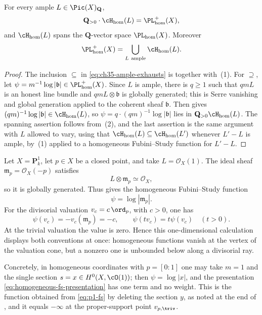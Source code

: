 \begin{corollary}
\label{cor:ch35-ample-exhausts}
For every ample $L\in\Pic(X)_{\mathbf Q}$,
\begin{equation}
\label{eq:ch35-ample-exhausts}
 \mathbf Q_{>0}\cdot\cH_{\mathrm{hom}}(L)=\PL^+_{\mathrm{hom}}(X),
\end{equation}
and $\cH_{\mathrm{hom}}(L)$ spans the $\mathbf Q$-vector space
$\PL_{\mathrm{hom}}(X)$.  Moreover
\[
 \PL^+_{\mathrm{hom}}(X)
   =\bigcup_{L\ \mathrm{ample}}\cH_{\mathrm{hom}}(L).
\]
\end{corollary}

\begin{proof}
The inclusion $\subseteq$ in \eqref{eq:ch35-ample-exhausts} is
 together with
\,(1).  For $\supseteq$, let
$\psi=m^{-1}\log|\mathfrak b|\in\PL^+_{\mathrm{hom}}(X)$.  Since $L$ is
ample, there is $q\geq1$ such that $qmL$ is an honest line bundle and
$qmL\otimes\mathfrak b$ is globally generated; this is Serre vanishing and
global generation applied to the coherent sheaf $\mathfrak b$.  Then
 gives
$(qm)^{-1}\log|\mathfrak b|\in\cH_{\mathrm{hom}}(L)$, so
$\psi=q\cdot(qm)^{-1}\log|\mathfrak b|$ lies in
$\mathbf Q_{>0}\cH_{\mathrm{hom}}(L)$.  The spanning assertion follows
from \,(2), and the last assertion is the
same argument with $L$ allowed to vary, using that
$\cH_{\mathrm{hom}}(L)\subseteq\cH_{\mathrm{hom}}(L')$ whenever
$L'-L$ is ample, by \,(1) applied to a
homogeneous Fubini--Study function for $L'-L$.
\end{proof}

\begin{example}
\label{ex:ch35-point-ideal-p1}
Let $X=\mathbf P^1_k$, let $p\in X$ be a closed point, and take
$L=\mathcal O_X(1)$.  The ideal sheaf
$\mathfrak m_p=\mathcal O_X(-p)$ satisfies
\[
       L\otimes\mathfrak m_p\simeq\mathcal O_X,
\]
so it is globally generated.  Thus  gives the
homogeneous Fubini--Study function
\[
                 \psi=\log|\mathfrak m_p|.
\]
For the divisorial valuation $v_c=c\,\ord_p$, with $c>0$, one has
\[
       \psi(v_c)=-v_c(\mathfrak m_p)=-c,
       \qquad
       \psi(tv_c)=t\psi(v_c)\quad(t>0).
\]
At the trivial valuation the value is zero.  Hence this one-dimensional
calculation displays both conventions at once: homogeneous functions vanish
at the vertex of the valuation cone, but a nonzero one is unbounded below
along a divisorial ray.

Concretely, in homogeneous coordinates with $p=[0:1]$ one may take
$m=1$ and the single section $s=x\in H^0(X,\cO(1))$; then
$\psi=\log|x|$, and the presentation
\eqref{eq:homogeneous-fs-presentation} has one term and no weight.  This is
the function obtained from \eqref{eq:p1-fs} by deleting the section $y$,
as noted at the end of , and it equals $-\infty$
at the proper-support point $v_{p,\triv}$.
\end{example}

